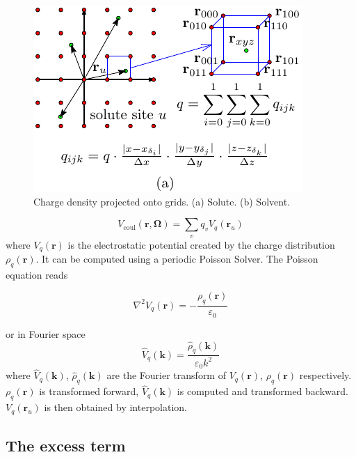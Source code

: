 \begin{figure}[h]
\begin{centering}
\includegraphics{_figure/charge_int}
\par\end{centering}
\caption{Charge density projected onto grids\label{fig:Charge-density-projected}.
(a) Solute. (b) Solvent.}
\end{figure}

\begin{equation}
V_{\mathrm{coul}}(\mathbf{r},\mathbf{\Omega})=\sum_{v}q_{v}V_{q}(\mathbf{r}_{u})
\end{equation}
where $V_{q}(\mathbf{r})$ is the electrostatic potential created
by the charge distribution $\rho_{q}(\mathbf{r})$. It can be computed
using a periodic Poisson Solver. The Poisson equation reads

\begin{equation}
\nabla^{2}V_{q}(\mathbf{r})=-\frac{\rho_{q}(\mathbf{r})}{\varepsilon_{0}}
\end{equation}

or in Fourier space
\begin{equation}
\hat{V}_{q}(\mathbf{k})=\frac{\hat{\rho}_{q}(\mathbf{k})}{\varepsilon_{0}k^{2}}
\end{equation}
where $\hat{V}_{q}(\mathbf{k})$, $\hat{\rho}_{q}(\mathbf{k})$ are
the Fourier transform of $V_{q}(\mathbf{r})$, $\rho_{q}(\mathbf{r})$
respectively. $\rho_{q}(\mathbf{r})$ is transformed forward, $\hat{V}_{q}(\mathbf{k})$
is computed and transformed backward. $V_{q}(\mathbf{r}_{u})$ is
then obtained by interpolation. 

\subsection{The excess term\label{subsec:The-excess-term}}

